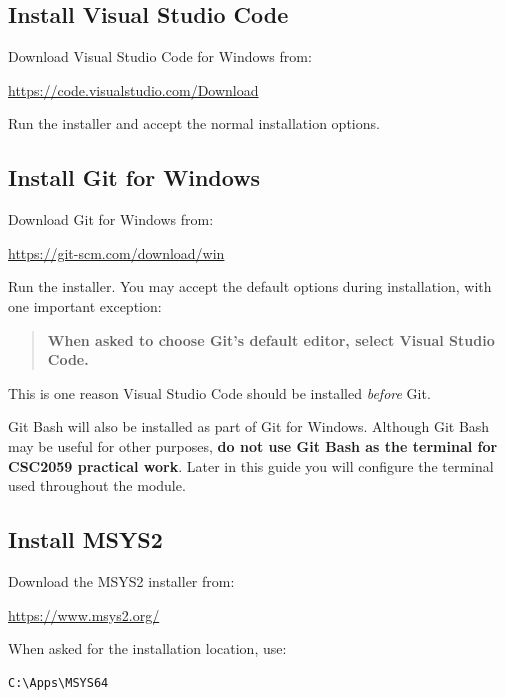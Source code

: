\documentclass{csc2059practical}
\begin{document}
\subsection{Install Visual Studio Code}

Download Visual Studio Code for Windows from:

\begin{center}
\url{https://code.visualstudio.com/Download}
\end{center}

Run the installer and accept the normal installation options.

\subsection{Install Git for Windows}

Download Git for Windows from:

\begin{center}
\url{https://git-scm.com/download/win}
\end{center}

Run the installer. You may accept the default options during installation, with one important exception:

\begin{quote}
\textbf{When asked to choose Git's default editor, select Visual Studio Code.}
\end{quote}

This is one reason Visual Studio Code should be installed \emph{before} Git.

Git Bash will also be installed as part of Git for Windows. Although Git Bash may be useful for other purposes, \textbf{do not use Git Bash as the terminal for CSC2059 practical work}. Later in this guide you will configure the terminal used throughout the module.

\subsection{Install MSYS2}

Download the MSYS2 installer from:

\begin{center}
\url{https://www.msys2.org/}
\end{center}

When asked for the installation location, use:

\begin{verbatim}
C:\Apps\MSYS64
\end{verbatim}
\end{document}
